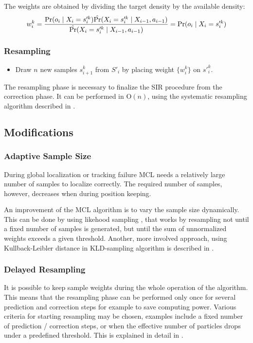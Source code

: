 The weights are obtained by dividing the target density by the available density:
\begin{equation}
	w^k_i = 
	\frac{
		\operatorname{\mathrm{Pr}}(o_i \mid X_i = s'^k_i) \hat{\operatorname{\mathrm{Pr}}}(X_i = s'^k_i \mid X_{i - 1}, a_{i - 1})
	}{
		\hat{\operatorname{\mathrm{Pr}}}(X_i =  s'^k_i \mid X_{i - 1}, a_{i - 1})
	} = \operatorname{\mathrm{Pr}}(o_i \mid X_i = s'^k_i)
\end{equation}

\subsubsection{Resampling}
\begin{itemize}
\item
Draw \(n\) new samples \(s^k_{i+1}\) from \(S'_i\) by placing
weight \(\{w^k_i\}\) on \(s'^k_{i}\).
\end{itemize}

The resampling phase is necessary to finalize the SIR procedure from the correction phase.
It can be performed in \(\mathrm{O}(n)\), using the systematic
resampling algorithm described in \cite{arulampalam01}.

\subsection{Modifications}

\subsubsection{Adaptive Sample Size}
During global localization or tracking failure MCL needs a relatively large number
of samples to localize correctly.
The required number of samples, however, decreases when during position keeping.

An improvement of the MCL algorithm is to vary the sample size dynamically.
This can be done by using likehood sampling \cite{fox99}, that works by
resampling not until a fixed number of samples is
generated, but until the sum of unnormalized weights exceeds a given threshold.
Another, more involved approach, using Kullback-Leibler distance in KLD-sampling algorithm
is described in \cite{fox03}.

\subsubsection{Delayed Resampling}
It is possible to keep sample weights during the whole operation of the algorithm.
This means that the resampling phase can be performed only once for several prediction and correction steps
for example to save computing power.
Various criteria for starting resampling may be chosen, examples include a fixed number of
prediction / correction steps, or when the effective number of particles drops under a predefined threshold.
This is explained in detail in \cite{arulampalam01}.

